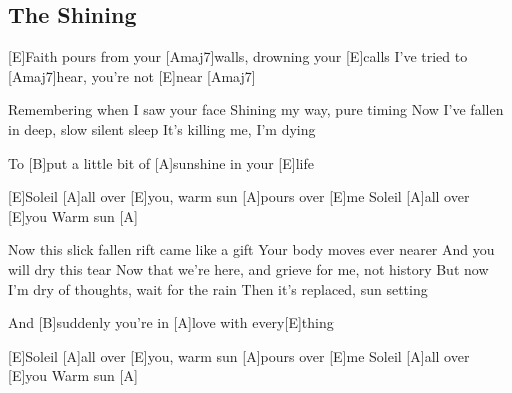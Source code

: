 \subsection*{The Shining   }



\begin{guitar}


[E]Faith pours from your [Amaj7]walls, drowning your [E]calls
I've tried to [Amaj7]hear, you're not [E]near [Amaj7] 



Remembering when I saw your face
Shining my way, pure timing
Now I've fallen in deep, slow silent sleep
It's killing me, I'm dying


To [B]put a little bit of [A]sunshine in your [E]life


[E]Soleil [A]all over [E]you, warm sun [A]pours over [E]me
Soleil [A]all over [E]you
Warm sun [A] $\quad$


Now this slick fallen rift came like a gift
Your body moves ever nearer
And you will dry this tear
Now that we're here, and grieve for me, not history
But now I'm dry of thoughts, wait for the rain
Then it's replaced, sun setting


And [B]suddenly you're in [A]love with every[E]thing


[E]Soleil [A]all over [E]you, warm sun [A]pours over [E]me
Soleil [A]all over [E]you
Warm sun [A] $\quad$
\end{guitar}
